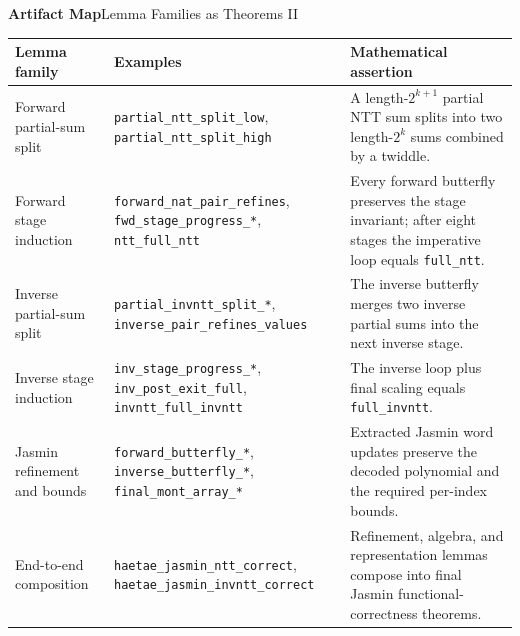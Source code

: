 \documentclass[10pt,aspectratio=1610,compress,dvipsnames]{beamer}
\newcommand{\ec}[1]{\texttt{#1}}
\begin{document}
\begin{frame}{\bfseries Artifact Map}{Lemma Families as Theorems II}
\begin{center}
\tiny\renewcommand{\arraystretch}{1.12}
\setlength{\tabcolsep}{3pt}
\begin{tabular}{p{3.0cm}p{3.7cm}p{5.3cm}}
\toprule[1.2pt]
\textbf{Lemma family} & \textbf{Examples} & \textbf{Mathematical assertion} \\
\midrule
Forward partial-sum split & \ec{partial\_ntt\_split\_low},
\ec{partial\_ntt\_split\_high} & A length-$2^{k+1}$ partial NTT sum splits
into two length-$2^k$ sums combined by a twiddle. \\
Forward stage induction & \ec{forward\_nat\_pair\_refines},
\ec{fwd\_stage\_progress\_*}, \ec{ntt\_full\_ntt} & Every forward butterfly
preserves the stage invariant; after eight stages the imperative loop equals
\ec{full\_ntt}. \\
Inverse partial-sum split & \ec{partial\_invntt\_split\_*},
\ec{inverse\_pair\_refines\_values} & The inverse butterfly merges two inverse
partial sums into the next inverse stage. \\
Inverse stage induction & \ec{inv\_stage\_progress\_*},
\ec{inv\_post\_exit\_full}, \ec{invntt\_full\_invntt} & The inverse loop plus
final scaling equals \ec{full\_invntt}. \\
Jasmin refinement and bounds & \ec{forward\_butterfly\_*},
\ec{inverse\_butterfly\_*}, \ec{final\_mont\_array\_*} & Extracted Jasmin word
updates preserve the decoded polynomial and the required per-index bounds. \\
End-to-end composition & \ec{haetae\_jasmin\_ntt\_correct},
\ec{haetae\_jasmin\_invntt\_correct} & Refinement, algebra, and representation
lemmas compose into final Jasmin functional-correctness theorems. \\
\bottomrule[1.2pt]
\end{tabular}
\end{center}
\end{frame}
\end{document}
